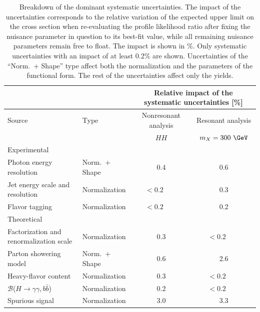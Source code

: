 \documentclass[PAPER, cernpreprint, texlive=2016, paper=a4, USenglish, texmf]{atlasdoc}
\begin{document}
\begin{table}[!htb]
\footnotesize
\caption{Breakdown of the dominant systematic uncertainties.
The impact of the uncertainties
corresponds to the relative variation of the expected upper limit on the cross section when re-evaluating the profile likelihood ratio after fixing the nuisance parameter in question to its best-fit value, while all remaining nuisance parameters remain free to float.
The impact is shown in \%. Only systematic uncertainties with an impact of at least 0.2\% are shown. Uncertainties of the ``Norm.\ + Shape'' type affect both the normalization and the parameters of the functional form. The rest of the uncertainties affect only the yields. 
}
\begin{center}
\begin{tabular}{llcc}
\toprule
\toprule
&   & \multicolumn{2}{c}{Relative impact of the systematic uncertainties [\%]} \\
\midrule
Source &  Type & \multicolumn{1}{c}{Nonresonant analysis} &  \multicolumn{1}{c}{Resonant analysis}  \\
&       & $HH$    &   $m_{X}=300~\GeV$ \\
\midrule
Experimental \\
\midrule
Photon energy resolution & Norm.\ + Shape & 0.4 &  0.6 \\ 
Jet energy scale and resolution & Normalization & $<0.2$~~~~ & 0.3 \\
Flavor tagging & Normalization &  $<0.2$~~~~ & 0.2 \\
\midrule
Theoretical \\
\midrule
Factorization and renormalization scale & Normalization & 0.3 &  $<0.2$~~~~ \\
Parton showering model & Norm.\ + Shape & 0.6 & 2.6 \\
Heavy-flavor content   & Normalization & 0.3 & $<0.2$~~~~ \\
$\mathcal{B}$($H\rightarrow \gamma\gamma, b\bar{b}$) &  Normalization & 0.2 &  $<0.2$~~~~ \\
\midrule
Spurious signal & Normalization & 3.0 & 3.3\\
\bottomrule
\bottomrule
\end{tabular}
\label{tab:syst}
\end{center}
\end{table}
 
 
 
 
\FloatBarrier
 
\end{document}

